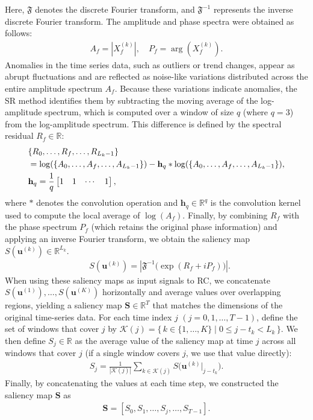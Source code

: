 \documentclass[pdflatex,sn-nature]{sn-jnl}
\theoremstyle{thmstyleone}%
\theoremstyle{thmstyletwo}%
\theoremstyle{thmstylethree}%
\begin{document}
Here, $\mathfrak{F}$ denotes the discrete Fourier transform, and $\mathfrak{F}^{-1}$ represents the inverse discrete Fourier transform.
The amplitude and phase spectra were obtained as follows:
\begin{align}
    A_f = |X^{(k)}_{f}|, \quad P_f = \arg(X^{(k)}_{f}).
\end{align}
Anomalies in the time series data, such as outliers or trend changes, appear as abrupt fluctuations and are reflected as noise-like variations distributed across the entire amplitude spectrum $A_f$.
Because these variations indicate anomalies, the SR method identifies them by subtracting the moving average of the log-amplitude spectrum, which is computed over a window of size $q$ (where $q=3$) from the log-amplitude spectrum.
This difference is defined by the spectral residual \(R_f \in \mathbb{R}\):
\begin{align}
    &\{R_0,\dots,R_f,\dots,R_{L_k-1}\} \\
    &= \log(\{A_0,\dots,A_f,\dots,A_{L_k-1}\}) - \mathbf{h}_q * \log(\{A_0,\dots,A_f,\dots,A_{L_k-1}\}),\notag\\ 
    &\mathbf{h}_q = \frac{1}{q}\begin{bmatrix}1 & 1 & \dotsb & 1\end{bmatrix},
\end{align}
where \(*\) denotes the convolution operation and \(\mathbf{h}_q\in \mathbb{R}^q\) is the convolution kernel used to compute the local average of $\log(A_f)$.
Finally, by combining \(R_f\) with the phase spectrum \(P_f\) (which retains the original phase information) and applying an inverse Fourier transform, we obtain the saliency map $S(\mathbf{u}^{(k)}) \in \mathbb{R}^{L_k}$.
\begin{align}
 &S(\mathbf{u}^{(k)})
 = \left| \mathfrak{F}^{-1} \bigl( \exp (R_f+iP_f) \bigr) \right|.
\end{align}
When using these saliency maps as input signals to RC, we concatenate $S(\mathbf{u}^{(1)}),\dots,S(\mathbf{u}^{(K)})$ horizontally and average values over overlapping regions, yielding a saliency map $\mathbf{S} \in \mathbb{R}^{T}$ that matches the dimensions of the original time-series data.
For each time index $j$ $(j=0,1,\dots,T-1)$, define the set of windows that cover $j$ by $\mathcal{K}(j)=\{\,k\in\{1,\ldots,K\}\mid 0\le j-t_k<L_k\,\}$.
We then define $S_j\in\mathbb{R}$ as the average value of the saliency map at time $j$ across all windows that cover $j$ (if a single window covers $j$, we use that value directly):
\begin{align}
    S_j=\frac{1}{|\mathcal{K}(j)|}\sum_{k\in \mathcal{K}(j)} S\bigl(\mathbf{u}^{(k)}|_{j-t_k}\bigr).
\end{align}
Finally, by concatenating the values at each time step, we constructed the saliency map $\mathbf{S}$ as
\begin{align}
    \mathbf{S}=[S_0,S_1,\ldots,S_j,\ldots,S_{T-1}].
\end{align}
\end{document}
